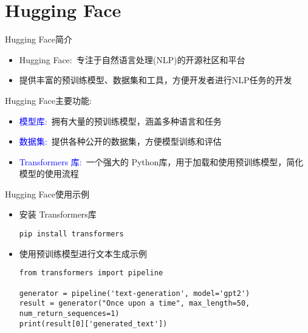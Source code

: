 \section{\rm{Hugging Face}}
\begin{frame}{\textrm{Hugging Face}简介}
    \begin{itemize}
	    \item \textrm{Hugging Face}:~专注于自然语言处理\textrm{(NLP)}的开源社区和平台
	    \item 提供丰富的预训练模型、数据集和工具，方便开发者进行\textrm{NLP}任务的开发
    \end{itemize}
    \vskip 5pt
\textrm{Hugging Face}主要功能:
    \begin{itemize}
	    \setlength{\itemsep}{8pt}
	    \item \textcolor{blue}{模型库:}~拥有大量的预训练模型，涵盖多种语言和任务\\
		    {\fontsize{7.5pt}{6.2pt}\selectfont{如文本分类、情感分析、机器翻译等}}
	    \item \textcolor{blue}{数据集:}~提供各种公开的数据集，方便模型训练和评估
	    \item \textcolor{blue}{Transformers 库:}~一个强大的 \textrm{Python}库，用于加载和使用预训练模型，简化模型的使用流程
    \end{itemize}
\end{frame}

\begin{frame}[fragile]{\textrm{Hugging Face}使用示例}
    \begin{itemize}
	    \item 安装 \textrm{Transformers}库
        \begin{lstlisting}[style=pythonstyle]
pip install transformers
        \end{lstlisting}
        \item 使用预训练模型进行文本生成示例
        \begin{lstlisting}[style=pythonstyle]
from transformers import pipeline

generator = pipeline('text-generation', model='gpt2')
result = generator("Once upon a time", max_length=50, num_return_sequences=1)
print(result[0]['generated_text'])
        \end{lstlisting}
    \end{itemize}
\end{frame}

